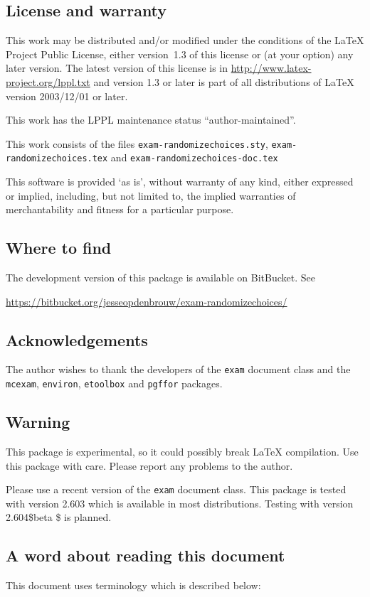 \documentclass[12pt,a4paper]{exam}
\begin{document}
\subsection{License and warranty}
This work may be distributed and/or modified under the
conditions of the \LaTeX{} Project Public
License, either version~1.3 of this
license or (at your option) any later version.  The latest version
of this license is in \url{http://www.latex-project.org/lppl.txt}
and version 1.3 or later is part of all distributions of \LaTeX{}
version 2003/12/01 or later.

This work has the LPPL maintenance status ``author-maintained''.

This work consists of the files \texttt{exam-randomizechoices.sty},
\texttt{exam-randomizechoices.tex} and \texttt{exam-randomizechoices-doc.tex}

This software is provided `as is', without warranty of any kind,
either expressed or implied, including, but not limited to, the
implied warranties of merchantability and fitness for a
particular purpose.

\subsection{Where to find}
The development version of this package is available on BitBucket. See

\url{https://bitbucket.org/jesseopdenbrouw/exam-randomizechoices/}

\subsection{Acknowledgements}
The author wishes to thank the developers of the \verb|exam| document
class and the \verb|mcexam|, \verb|environ|, \verb|etoolbox| and \verb|pgffor|
packages.

\subsection{Warning}
This package is experimental, so it could possibly break \LaTeX{}
compilation. Use this package with care. Please report any problems
to the author.

Please use a recent version of the \texttt{exam} document class. This
package is tested with version 2.603 which is available in most distributions.
Testing with version 2.604\$beta \$ is planned.

\subsection{A word about reading this document}
This document uses terminology which is described below:
\end{document}
